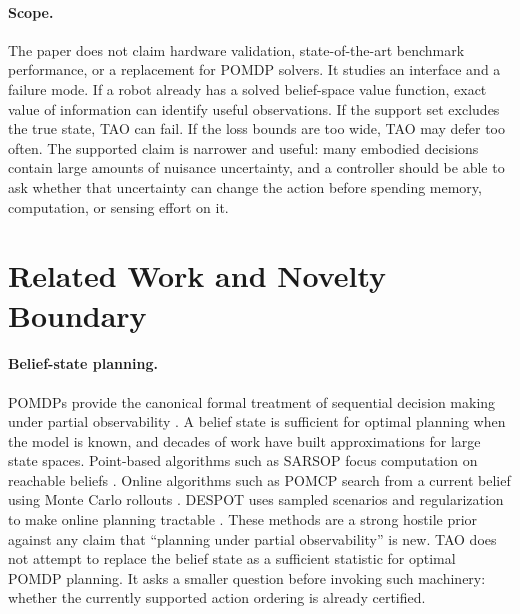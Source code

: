 \documentclass{article}
\begin{document}
\paragraph{Scope.}
The paper does not claim hardware validation, state-of-the-art benchmark performance, or a replacement for POMDP solvers. It studies an interface and a failure mode. If a robot already has a solved belief-space value function, exact value of information can identify useful observations. If the support set excludes the true state, TAO can fail. If the loss bounds are too wide, TAO may defer too often. The supported claim is narrower and useful: many embodied decisions contain large amounts of nuisance uncertainty, and a controller should be able to ask whether that uncertainty can change the action before spending memory, computation, or sensing effort on it.

\section{Related Work and Novelty Boundary}

\paragraph{Belief-state planning.}
POMDPs provide the canonical formal treatment of sequential decision making under partial observability \citep{kaelbling1998planning}. A belief state is sufficient for optimal planning when the model is known, and decades of work have built approximations for large state spaces. Point-based algorithms such as SARSOP focus computation on reachable beliefs \citep{kurniawati2008sarsop}. Online algorithms such as POMCP search from a current belief using Monte Carlo rollouts \citep{silver2010pomcp}. DESPOT uses sampled scenarios and regularization to make online planning tractable \citep{somani2013despot}. These methods are a strong hostile prior against any claim that ``planning under partial observability'' is new. TAO does not attempt to replace the belief state as a sufficient statistic for optimal POMDP planning. It asks a smaller question before invoking such machinery: whether the currently supported action ordering is already certified.
\end{document}
